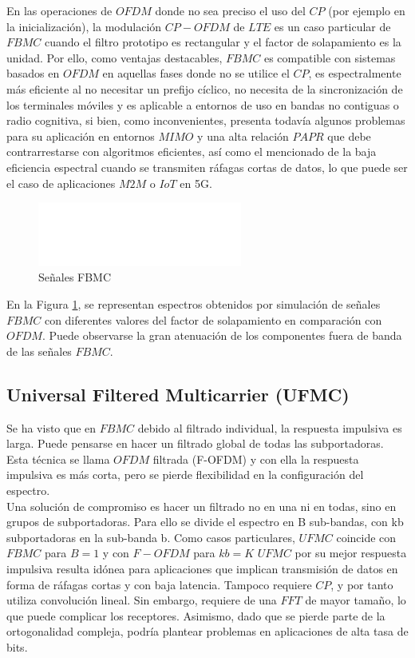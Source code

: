 \documentclass[]{article}
\begin{document}
En las operaciones de $OFDM$ donde no sea preciso el uso del $CP$ (por ejemplo en la inicialización), la modulación $CP-OFDM$ de $LTE$ es un caso particular de $FBMC$ cuando el filtro prototipo es rectangular y el factor de solapamiento es la unidad. Por ello, como ventajas destacables, $FBMC$ es compatible con sistemas basados en $OFDM$ en aquellas fases donde no se utilice el $CP$, es espectralmente más eficiente al no necesitar un prefijo cíclico, no necesita de la sincronización de los terminales móviles y es aplicable a entornos de uso en bandas no contiguas o radio cognitiva, si bien, como inconvenientes, presenta todavía algunos problemas para su aplicación en entornos $MIMO$ y una alta relación $PAPR$ que debe contrarrestarse con algoritmos eficientes, así como el mencionado de la baja eficiencia espectral cuando se transmiten ráfagas cortas de datos, lo que puede ser el caso de aplicaciones $M2M$ o $IoT$ en 5G.\\


\begin{figure}[h!]
	\centering
	\includegraphics[width=0.6\textwidth]{Imagenes/FBMC.png}
	\caption{Señales FBMC}
	\label{fig:FBMC}
\end{figure}

En la Figura \ref{fig:FBMC}, se representan espectros obtenidos por simulación de señales $FBMC$ con diferentes valores del factor de solapamiento en comparación con $OFDM$. Puede observarse la gran atenuación de los componentes fuera de banda de las señales $FBMC$.\\ 

\subsection{Universal Filtered Multicarrier (UFMC)}

Se ha visto que en $FBMC$ debido al filtrado individual, la respuesta impulsiva es larga. Puede pensarse en hacer un filtrado global de todas las subportadoras. Esta técnica se llama $OFDM$ filtrada (F-OFDM) y con ella la respuesta impulsiva es más corta, pero se pierde flexibilidad en la configuración del espectro.\\

Una solución de compromiso es hacer un filtrado no en una ni en todas, sino en grupos de subportadoras. Para ello se divide el espectro en B sub-bandas, con kb subportadoras en la sub-banda b.
Como casos particulares, $UFMC$ coincide con $FBMC$ para $B=1$ y con $F-OFDM$ para $kb= K$ 
$UFMC$ por su mejor respuesta impulsiva resulta idónea para aplicaciones que implican transmisión de datos en forma de ráfagas cortas y con baja latencia. Tampoco requiere $CP$, y por tanto utiliza convolución lineal. Sin embargo, requiere de una $FFT$ de mayor tamaño, lo que puede complicar los receptores. Asimismo, dado que se pierde parte de la ortogonalidad compleja, podría plantear problemas en aplicaciones de alta tasa de bits. \\
\end{document}
